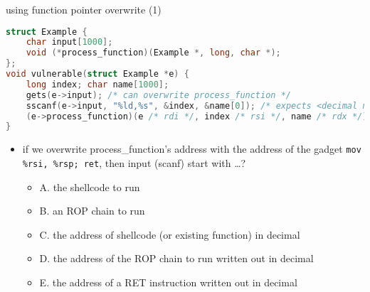 \begin{frame}[fragile,label=useFPtrOverwrite1]{using function pointer overwrite (1)}
\begin{lstlisting}[language=C,style=script]
struct Example {
    char input[1000];
    void (*process_function)(Example *, long, char *);
};
void vulnerable(struct Example *e) {
    long index; char name[1000];
    gets(e->input); /* can overwrite process_function */
    sscanf(e->input, "%ld,%s", &index, &name[0]); /* expects <decimal number>,<string> */
    (e->process_function)(e /* rdi */, index /* rsi */, name /* rdx */);
}
\end{lstlisting}
\begin{itemize}
\item \small if we overwrite process\_function's address with the address of the gadget
    \texttt{mov \%rsi, \%rsp; ret}, then input (scanf) start with \ldots?
    \begin{itemize}
    \item A. the shellcode to run
    \item B. an ROP chain to run
    \item C. the address of shellcode (or existing function) in decimal
    \item D. the address of the ROP chain to run written out in decimal
    \item E. the address of a RET instruction written out in decimal
    \end{itemize}
\end{itemize}
\end{frame}

